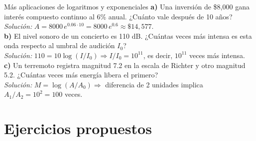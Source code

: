 \documentclass[12pt,letterpaper]{book}
\begin{document}
\begin{center}
\end{center}

\begin{aplbox}{Más aplicaciones de logaritmos y exponenciales}
\textbf{a)} Una inversión de \$8{,}000 gana interés compuesto continuo al 6\% anual. ¿Cuánto vale después de 10 años?\\
\textit{Solución:} $A=8000\,e^{0.06\cdot10}=8000\,e^{0.6}\approx\$14{,}577$.\\[4pt]
\textbf{b)} El nivel sonoro de un concierto es 110 dB. ¿Cuántas veces más intensa es esta onda respecto al umbral de audición $I_0$?\\
\textit{Solución:} $110=10\log(I/I_0)\Rightarrow I/I_0=10^{11}$, es decir, $10^{11}$ veces más intensa.\\[4pt]
\textbf{c)} Un terremoto registra magnitud 7.2 en la escala de Richter y otro magnitud 5.2. ¿Cuántas veces más energía libera el primero?\\
\textit{Solución:} $M=\log(A/A_0)\Rightarrow$ diferencia de 2 unidades implica $A_1/A_2=10^2=100$ veces.
\end{aplbox}

\section{Ejercicios propuestos}
\end{document}
